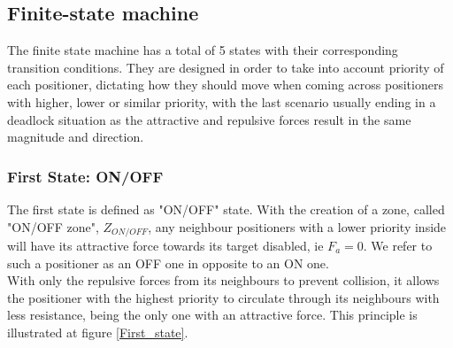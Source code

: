 \documentclass[]{spie}  %
\begin{document}
	\subsection{Finite-state machine}	
	
	The finite state machine has a total of 5 states with their corresponding transition conditions. They are designed in order to take into account priority of each positioner, dictating how they should move when coming across positioners with higher, lower or similar priority, with the last scenario usually ending in a deadlock situation as the attractive and repulsive forces result in the same magnitude and direction. 
	\subsubsection{First State: ON/OFF}
	\label{first_state_chap}
	The first state  is defined as "ON/OFF" state. With the creation of a zone, called "ON/OFF zone", $Z_{ON/OFF}$,  any neighbour positioners with a lower priority inside will have its attractive force towards its target disabled, ie $F_a = 0$. We refer to such a positioner as an OFF one in opposite to an ON one.\\
	 With only the repulsive forces from its neighbours to prevent collision,  it allows the positioner with the highest priority to circulate through its neighbours with less resistance, being the only one with an attractive force. This principle is illustrated at figure \ref{First_state}. 	
\end{document}
